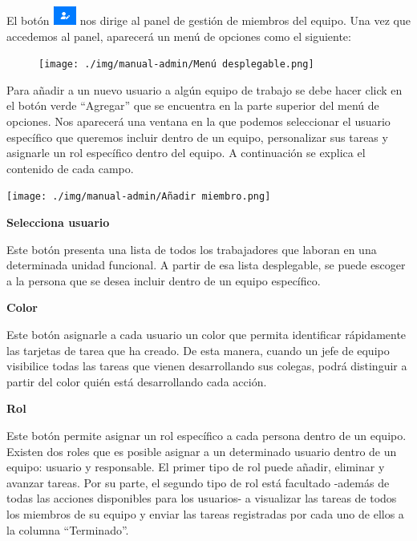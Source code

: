 \documentclass[
  letterpaper,
  DIV=11,
  numbers=noendperiod]{scrreprt}
\begin{document}
El botón
\includegraphics[width=0.30208in,height=0.23958in]{./img/manual-admin/Botón de gestión de equipos.png}
nos dirige al panel de gestión de miembros del equipo. Una vez que
accedemos al panel, aparecerá un menú de opciones como el siguiente:

\begin{figure}

{\centering \texttt{[image: ./img/manual-admin/Menú desplegable.png]}

}

\end{figure}

Para añadir a un nuevo usuario a algún equipo de trabajo se debe hacer
click en el botón verde ``Agregar'' que se encuentra en la parte
superior del menú de opciones. Nos aparecerá una ventana en la que
podemos seleccionar el usuario específico que queremos incluir dentro de
un equipo, personalizar sus tareas y asignarle un rol específico dentro
del equipo. A continuación se explica el contenido de cada campo.

\texttt{[image: ./img/manual-admin/Añadir miembro.png]}

\textbf{Selecciona usuario}

Este botón presenta una lista de todos los trabajadores que laboran en
una determinada unidad funcional. A partir de esa lista desplegable, se
puede escoger a la persona que se desea incluir dentro de un equipo
específico.

\textbf{Color}

Este botón asignarle a cada usuario un color que permita identificar
rápidamente las tarjetas de tarea que ha creado. De esta manera, cuando
un jefe de equipo visibilice todas las tareas que vienen desarrollando
sus colegas, podrá distinguir a partir del color quién está
desarrollando cada acción.

\textbf{Rol}

Este botón permite asignar un rol específico a cada persona dentro de un
equipo. Existen dos roles que es posible asignar a un determinado
usuario dentro de un equipo: usuario y responsable. El primer tipo de
rol puede añadir, eliminar y avanzar tareas. Por su parte, el segundo
tipo de rol está facultado -además de todas las acciones disponibles
para los usuarios- a visualizar las tareas de todos los miembros de su
equipo y enviar las tareas registradas por cada uno de ellos a la
columna ``Terminado''.
\end{document}
